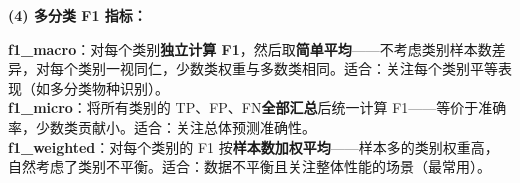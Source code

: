 \documentclass[a4paper,11pt]{ctexart}
\begin{document}
\begin{solutionbox}[参考答案与详细解析]
    \textbf{(4) 多分类 F1 指标：}

    \begin{keybox}
        \textbf{f1\_macro}：对每个类别\textbf{独立计算 F1}，然后取\textbf{简单平均}——不考虑类别样本数差异，对每个类别一视同仁，少数类权重与多数类相同。适合：关注每个类别平等表现（如多分类物种识别）。\\
        \textbf{f1\_micro}：将所有类别的 TP、FP、FN\textbf{全部汇总}后统一计算 F1——等价于准确率，少数类贡献小。适合：关注总体预测准确性。\\
        \textbf{f1\_weighted}：对每个类别的 F1 按\textbf{样本数加权平均}——样本多的类别权重高，自然考虑了类别不平衡。适合：数据不平衡且关注整体性能的场景（最常用）。
    \end{keybox}
\end{solutionbox}
\end{document}
